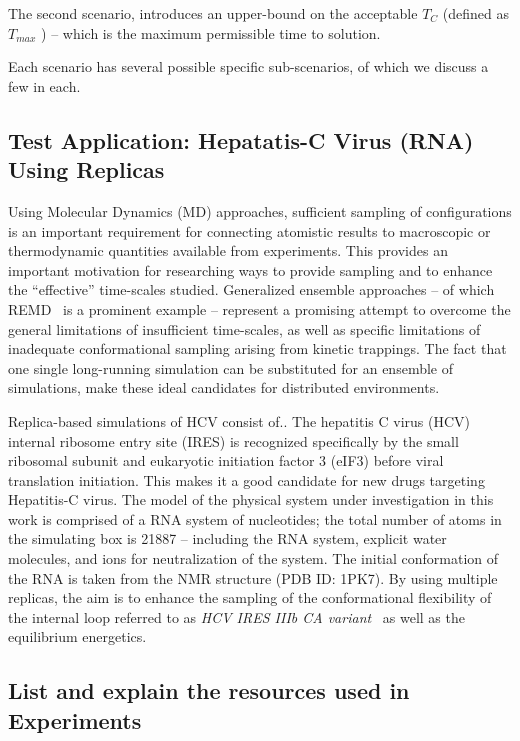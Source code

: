\documentclass[conference,final]{IEEEtran}
\newcommand{\tmax}{$T_{max}$ }
\newcommand{\tc}{$T_{C}$ }
\begin{document}
The second scenario, introduces an upper-bound on the acceptable \tc
(defined as \tmax) -- which is the maximum permissible time to
solution.

Each scenario has several possible specific sub-scenarios, of which we
discuss a few in each.

\subsection{Test Application: Hepatatis-C Virus (RNA) Using
  Replicas}

Using Molecular Dynamics (MD) approaches, sufficient sampling of
configurations is an important requirement for connecting atomistic
results to macroscopic or thermodynamic quantities available from
experiments. This provides an important motivation for researching
ways to provide sampling and to enhance the ``effective'' time-scales
studied.  Generalized ensemble approaches -- of which
REMD~\cite{Sugita:1999rm} is a prominent example -- represent a
promising attempt to overcome the general limitations of insufficient
time-scales, as well as specific limitations of inadequate
conformational sampling arising from kinetic trappings.  The fact that
one single long-running simulation can be substituted for an ensemble
of simulations, make these ideal candidates for distributed
environments.

Replica-based simulations of HCV consist of..  The hepatitis C virus
(HCV) internal ribosome entry site (IRES) is recognized specifically
by the small ribosomal subunit and eukaryotic initiation factor 3
(eIF3) before viral translation initiation.  This makes it a good
candidate for new drugs targeting Hepatitis-C virus.  The model of the
physical system under investigation in this work is comprised of a RNA
system of nucleotides; the total number of atoms in the simulating box
is 21887 -- including the RNA system, explicit water molecules, and
ions for neutralization of the system.  The initial conformation of
the RNA is taken from the NMR structure (PDB ID: 1PK7).  By using
multiple replicas, the aim is to enhance the sampling of the
conformational flexibility of the internal loop referred to as {\it
  HCV IRES IIIb CA variant}~\cite{Collier:2002wd} as well as the
equilibrium energetics.

\subsection{List and explain the resources used in Experiments}
\end{document}
